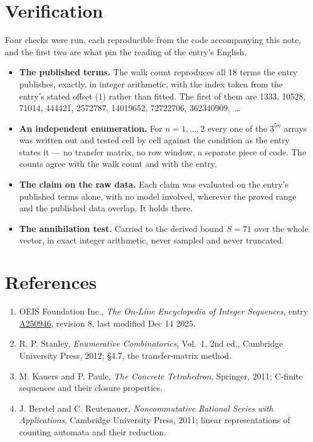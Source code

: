 \documentclass[11pt]{article}
\theoremstyle{definition}
\begin{document}
\section{Verification}

Four checks were run, each reproducible from the code accompanying this note, and the first two are what pin the reading of the entry's English.

\begin{itemize}

\item {\bfseries The published terms.} The walk count reproduces all 18 terms the entry publishes, exactly, in integer arithmetic, with the index taken from the entry's stated offset (1) rather than fitted. The first of them are 1333, 10528, 71014, 444421, 2572787, 14019652, 72722706, 362340909,~\dots

\item {\bfseries An independent enumeration.} For $n = 1,\dots,2$ every one of the $3^{5n}$ arrays was written out and tested cell by cell against the condition as the entry states it --- no transfer matrix, no row window, a separate piece of code. The counts agree with the walk count and with the entry.

\item {\bfseries The claim on the raw data.} Each claim was evaluated on the entry's published terms alone, with no model involved, wherever the proved range and the published data overlap. It holds there.

\item {\bfseries The annihilation test.} Carried to the derived bound $S = 71$ over the whole vector, in exact integer arithmetic, never sampled and never truncated.

\end{itemize}

\section{References}

\begin{enumerate}

\item OEIS Foundation Inc., \emph{The On-Line Encyclopedia of Integer Sequences}, entry \href{https://oeis.org/A250946}{A250946}, revision 8, last modified Dec 14 2025.

\item R. P. Stanley, \emph{Enumerative Combinatorics}, Vol.~1, 2nd ed., Cambridge University Press, 2012; \S4.7, the transfer-matrix method.

\item M. Kauers and P. Paule, \emph{The Concrete Tetrahedron}, Springer, 2011; C-finite sequences and their closure properties.

\item J. Berstel and C. Reutenauer, \emph{Noncommutative Rational Series with Applications}, Cambridge University Press, 2011; linear representations of counting automata and their reduction.

\end{enumerate}
\end{document}

